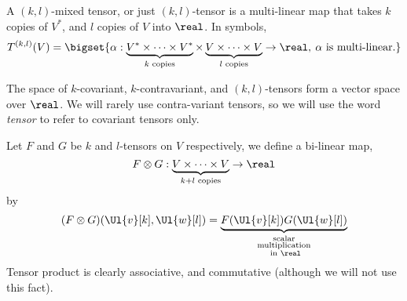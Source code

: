 \documentclass[../main-v2-manifolds.tex]{subfiles}
\begin{document}
\begin{definition}
    A $(k,l)$-mixed tensor, or just $(k,l)$-tensor is a multi-linear map that takes $k$ copies of $V^*$, and $l$ copies of $V$ into $\real$. In symbols, 
    \[
        T^{(k,l)}(V) = \bigset{\alpha: \underbrace{V^*\times\cdots\times V^*}_{k\text{ copies}}\times \underbrace{V\times\cdots\times V}_{l\text{ copies}}\to\real,\: \alpha\text{ is multi-linear.}}
    \]
\end{definition}

The space of $k$-covariant, $k$-contravariant, and $(k,l)$-tensors form a vector space over $\real$. We will rarely use contra-variant tensors, so we will use the word \emph{tensor} to refer to covariant tensors only.

\begin{definition}
    Let $F$ and $G$ be $k$ and $l$-tensors on $V$ respectively, we define a bi-linear map,
    \[
        F\otimes G: \underbrace{V\times \cdots \times V}_{k+l\text{ copies}}\to\real
    \]
    by
    \[
        (F\otimes G)(\Ul{v}[k],\Ul{w}[l]) = \underbrace{F(\Ul{v}[k])G(\Ul{w}[l])}_{\substack{\text{scalar}\\ \text{multiplication}\\ \text{ in }\real}}
    \]
    Tensor product is clearly associative, and commutative (although we will not use this fact).
\end{definition}
\end{document}
